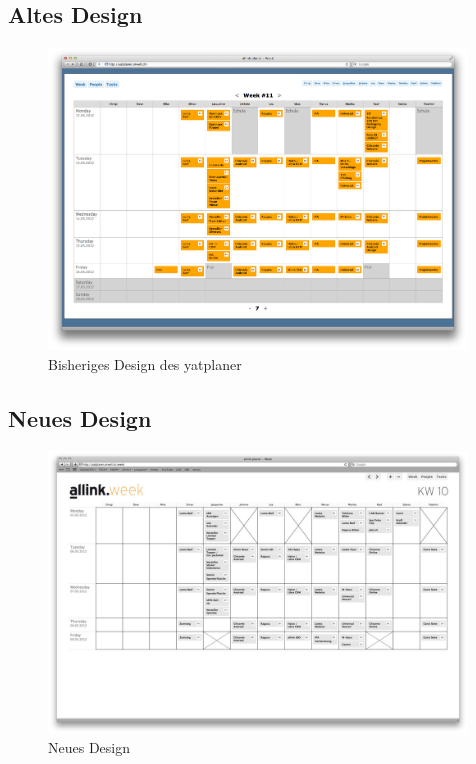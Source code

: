 \subsection{Altes Design}
\begin{figure}[!ht]
\begin{center}
\includegraphics[width=0.99\textwidth,angle=0]{./bilder/yatplaner.png}
\caption{Bisheriges Design des yatplaner}
\end{center}
\end{figure}

\clearpage
\subsection{Neues Design}
\begin{figure}[!ht]
\begin{center}
\includegraphics[width=0.99\textwidth,angle=0]{./bilder/wochenplaner.jpg}
\caption{Neues Design}
\end{center}
\end{figure}

